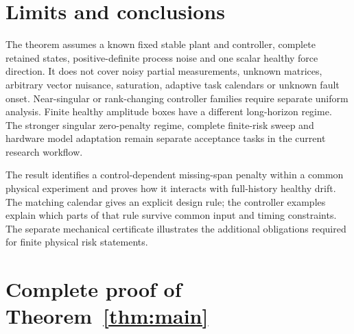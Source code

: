 \documentclass[11pt]{article}
\begin{document}
\section{Limits and conclusions}
The theorem assumes a known fixed stable plant and controller, complete retained
states, positive-definite process noise and one scalar healthy force direction.
It does not cover noisy partial measurements, unknown matrices, arbitrary
vector nuisance, saturation, adaptive task calendars or unknown fault onset.
Near-singular or rank-changing controller families require separate uniform
analysis. Finite healthy amplitude boxes have a different long-horizon regime.
The stronger singular zero-penalty regime, complete finite-risk sweep and hardware model
adaptation remain separate acceptance tasks in the current research workflow.

The result identifies a control-dependent missing-span penalty within a
common physical experiment and proves how it interacts with full-history
healthy drift. The matching calendar gives an explicit design rule; the
controller examples explain which parts of that rule survive common input
and timing constraints. The separate mechanical certificate illustrates the
additional obligations required for finite physical risk statements.

\appendix
\section{Complete proof of Theorem~\ref{thm:main}}\label{sec:proof}
\end{document}
